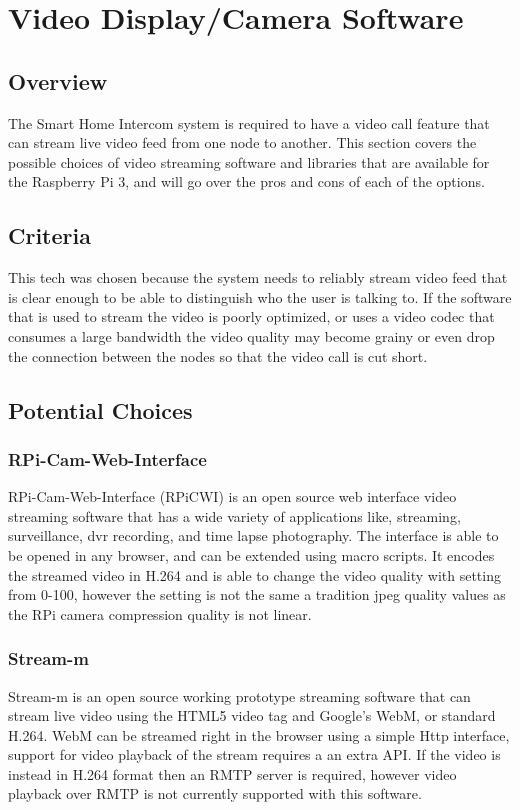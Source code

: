 \documentclass[onecolumn, draftclsnofoot,10pt, compsoc]{IEEEtran}
\begin{document}
\clearpage

\section{Video Display/Camera Software}

\subsection{Overview}
The Smart Home Intercom system is required to have a video call feature that can stream live video feed from one node to another. 
This section covers the possible choices of video streaming software and libraries that are available for the Raspberry Pi 3, and will go over the pros and cons of each of the options.

\subsection{Criteria}
 This tech was chosen because the system needs to reliably stream video feed that is clear enough to be able to distinguish who the user is talking to. 
 If the software that is used to stream the video is poorly optimized, or uses a video codec that consumes a large bandwidth the video quality may become grainy or even drop the connection between the nodes so that the video call is cut short.

\subsection{Potential Choices}


\subsubsection{RPi-Cam-Web-Interface}
RPi-Cam-Web-Interface (RPiCWI) is an open source web interface video streaming software that has a wide variety of applications like, streaming, surveillance, dvr recording, and time lapse photography. The interface is able to be opened in any browser, and can be extended using macro scripts. It encodes the streamed video in H.264 and is able to change the video quality with setting from 0-100, however the setting is not the same a tradition jpeg quality values as the RPi camera compression quality is not linear. 



\subsubsection{Stream-m}
Stream-m is an open source working prototype streaming software that can stream live video using the HTML5 video tag and Google's WebM, or standard H.264. WebM can be streamed right in the browser using a simple Http interface, support for video playback of the stream requires a an extra API. If the video is instead in H.264 format then an RMTP server is required, however video playback over RMTP is not currently supported with this software.
\end{document}
